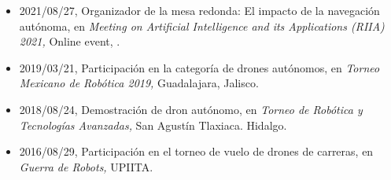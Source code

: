 \begin{itemize} 
\item 2021/08/27, Organizador de la mesa redonda: El impacto de la navegación autónoma, en \textit{ Meeting on Artificial Intelligence and its Applications (RIIA) 2021,} Online event, \href{https://www.dropbox.com/s/i73p5valw0ei3kb/2021_RIIA.pdf?dl=0}{\faFilePdfO}.
\item 2019/03/21, Participación en la categoría de drones autónomos, en \textit{ Torneo Mexicano de Robótica 2019,} Guadalajara, Jalisco.
\item 2018/08/24, Demostración de dron autónomo, en \textit{ Torneo de Robótica y Tecnologías Avanzadas,} San Agustín Tlaxiaca. Hidalgo.
\item 2016/08/29, Participación en el torneo de vuelo de drones de carreras, en \textit{ Guerra de Robots,} UPIITA.
\end{itemize} 
